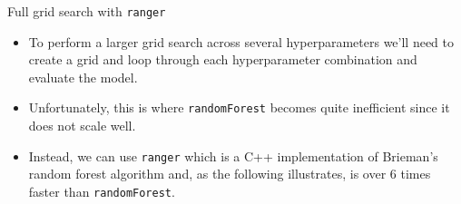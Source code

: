 \documentclass[10pt,ignorenonframetext,]{beamer}
\providecommand{\tightlist}{%
  \setlength{\itemsep}{0pt}\setlength{\parskip}{0pt}}
\begin{document}
\begin{frame}[fragile]{Full grid search with \texttt{ranger}}

\begin{itemize}
\tightlist
\item
  To perform a larger grid search across several hyperparameters we'll
  need to create a grid and loop through each hyperparameter combination
  and evaluate the model.
\item
  Unfortunately, this is where \texttt{randomForest} becomes quite
  inefficient since it does not scale well.
\item
  Instead, we can use \texttt{ranger} which is a C++ implementation of
  Brieman's random forest algorithm and, as the following illustrates,
  is over 6 times faster than \texttt{randomForest}.
\end{itemize}

\end{frame}
\end{document}
